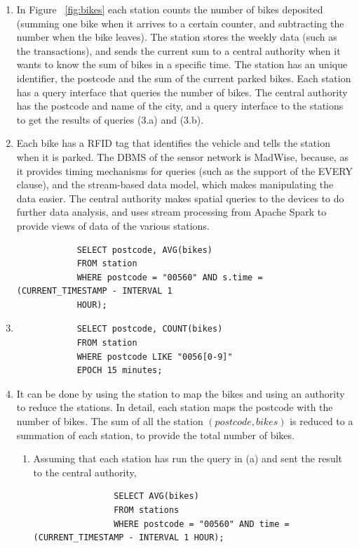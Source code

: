 \documentclass[acmsmall, screen,timestamp,nonacm]{acmart}
\begin{document}
\begin{enumerate}
	\item In Figure ~\ref{fig:bikes} each station counts the number of bikes
		deposited (summing one bike when it arrives to a certain counter, and
		subtracting the number when the bike leaves). The station stores the
		weekly data (such as the transactions), and sends the current sum to a
		central authority when it wants to know the sum of bikes in a specific
		time. 
		The station has an unique identifier, the postcode and the sum of the
		current parked bikes. Each station has a query interface that queries
		the number of bikes. The central authority has the postcode and name of the
		city, and a query interface to the stations to get the results of queries (3.a) and (3.b).
	\item Each bike has a RFID tag that identifies the vehicle and tells the
		station when it is parked. The DBMS of the sensor network is MadWise,
		because, as it provides timing mechanisms for queries (such as the
		support of the EVERY clause), and the stream-based data model, which
		makes manipulating the data easier. The central authority makes spatial
		queries to the devices to do further data analysis, and uses stream
		processing from Apache Spark to provide views of data of the various
		stations.
		\begin{verbatim}
			SELECT postcode, AVG(bikes)
			FROM station
			WHERE postcode = "00560" AND s.time = (CURRENT_TIMESTAMP - INTERVAL 1
			HOUR);
		\end{verbatim}
	\item 
		\begin{verbatim}
			SELECT postcode, COUNT(bikes)
			FROM station 
			WHERE postcode LIKE "0056[0-9]"
			EPOCH 15 minutes;
		\end{verbatim}
	\item It can be done by using the station to map the bikes and using an
		authority to reduce the stations. In detail, each station maps the postcode with the number 
		of bikes. The sum of
		all the station $(postcode, bikes) $ is reduced to a summation of each
		station, to provide the total number of bikes. 
		\begin{enumerate}
			\item Assuming that each station has run the query in (a) and sent
				the result to the central authority, 
				\begin{verbatim}
				SELECT AVG(bikes) 
				FROM stations
				WHERE postcode = "00560" AND time = (CURRENT_TIMESTAMP - INTERVAL 1 HOUR);			    

\end{verbatim}
\end{enumerate}
\end{enumerate}
\end{document}
